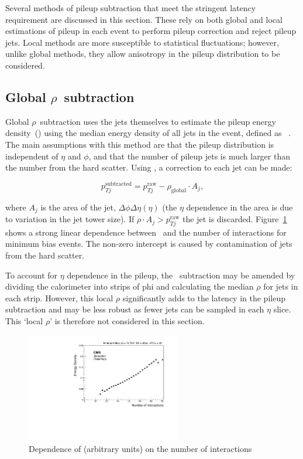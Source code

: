 Several methods of pileup subtraction that meet the stringent latency requirement
are discussed in this section. These rely on both global and local estimations of 
pileup in each event to perform pileup correction and reject pileup jets. 
Local methods are more susceptible to statistical fluctuations; however,
unlike global methods, they allow anisotropy in the 
pileup distribution to be considered.

\subsection{Global $\rho$~subtraction}

Global $\rho$~subtraction uses the jets themselves to estimate the pileup energy density~(\rhoP) using
the median energy density of all jets in the event, defined as \rhoG~\cite{jet_area}. 
The main assumptions with this method are that the pileup distribution is independent of $\eta$ and $\phi$,  
and that the number of pileup jets is much larger than the number from the hard scatter. Using \rhoG, 
a correction to each jet can be made:

\begin{equation}
\label{equ:global_rho}
p_{Tj}^{\text{subtracted}} = p_{Tj}^{\text{raw}} - \rho_{\text{global}} \cdot A_j,
\end{equation}


where $A_j$ is the area of the jet, $\Delta\phi\Delta\eta(\eta)$ (the $\eta$ dependence in the area is due 
to variation in the jet tower size). If $\rho \cdot A_j > p_{Tj}^{\text{raw}}$ the jet is discarded. 
Figure~\ref{fig:medianNint} shows a strong linear dependence between \rhoG~and the number of interactions for
minimum bias events. The non-zero intercept is caused by contamination of jets from the hard scatter.

To account for $\eta$ dependence in the pileup, the \rhoG~subtraction may be amended by
dividing the calorimeter into strips of phi and calculating the median $\rho$ for jets in each 
strip. However, this local $\rho$ significantly adds to the latency in the pileup subtraction and may 
be less robust as fewer jets can be sampled in each $\eta$ slice. This `local $\rho$' 
is therefore not considered in this section.

\begin{figure}
\centering
    \includegraphics[width=0.6\textwidth]{./Figures/triggerUpgrade/median}
  \caption{Dependence of \rhoG (arbitrary units) on the number of interactions}
  \label{fig:medianNint}
\end{figure}  

